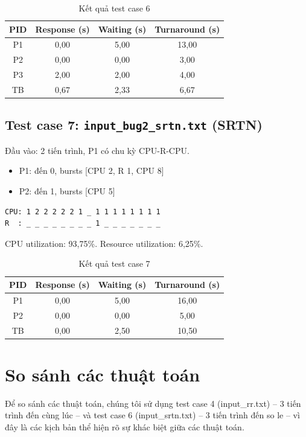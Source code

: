 \begin{table}[h]
\centering
\begin{tabular}{|c|c|c|c|}
\hline
PID & Response (s) & Waiting (s) & Turnaround (s) \\
\hline
P1 & 0,00 & 5,00 & 13,00 \\
P2 & 0,00 & 0,00 & 3,00 \\
P3 & 2,00 & 2,00 & 4,00 \\
\hline
TB & 0,67 & 2,33 & 6,67 \\
\hline
\end{tabular}
\caption{Kết quả test case 6}
\end{table}

\subsection{Test case 7: \texttt{input\_bug2\_srtn.txt} (SRTN)}

Đầu vào: 2 tiến trình, P1 có chu kỳ CPU-R-CPU.

\begin{itemize}
    \item P1: đến 0, bursts [CPU 2, R 1, CPU 8]
    \item P2: đến 1, bursts [CPU 5]
\end{itemize}

\begin{verbatim}
CPU: 1 2 2 2 2 2 1 _ 1 1 1 1 1 1 1 1
R  : _ _ _ _ _ _ _ _ 1 _ _ _ _ _ _ _
\end{verbatim}

CPU utilization: 93,75\%. Resource utilization: 6,25\%.

\begin{table}[h]
\centering
\begin{tabular}{|c|c|c|c|}
\hline
PID & Response (s) & Waiting (s) & Turnaround (s) \\
\hline
P1 & 0,00 & 5,00 & 16,00 \\
P2 & 0,00 & 0,00 & 5,00 \\
\hline
TB & 0,00 & 2,50 & 10,50 \\
\hline
\end{tabular}
\caption{Kết quả test case 7}
\end{table}

\section{So sánh các thuật toán}

Để so sánh các thuật toán, chúng tôi sử dụng test case 4 (input\_rr.txt) -- 3 tiến trình đến cùng lúc -- và test case 6 (input\_srtn.txt) -- 3 tiến trình đến so le -- vì đây là các kịch bản thể hiện rõ sự khác biệt giữa các thuật toán.

